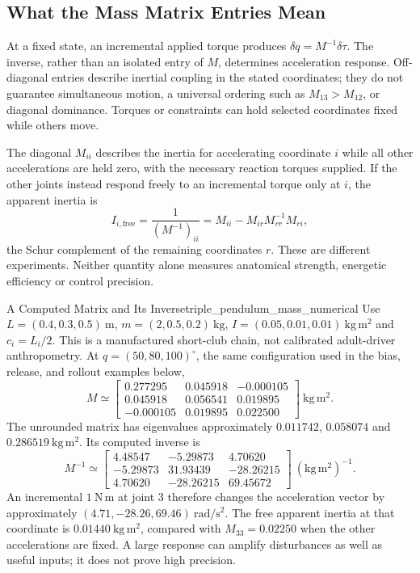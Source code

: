\subsection{What the Mass Matrix Entries Mean}
\label{inplain:mass_matrix_meaning}
\label{laymans:inplain:mass_matrix_meaning}
At a fixed state, an incremental applied torque produces $\delta\ddot q=M^{-1}\delta\tau$. The inverse, rather than an isolated entry of $M$, determines acceleration response. Off-diagonal entries describe inertial coupling in the stated coordinates; they do not guarantee simultaneous motion, a universal ordering such as $M_{13}>M_{12}$, or diagonal dominance. Torques or constraints can hold selected coordinates fixed while others move.

The diagonal $M_{ii}$ describes the inertia for accelerating coordinate $i$ while all other accelerations are held zero, with the necessary reaction torques supplied. If the other joints instead respond freely to an incremental torque only at $i$, the apparent inertia is
\[
I_{i,\mathrm{free}}=\frac{1}{(M^{-1})_{ii}}
=M_{ii}-M_{ir}M_{rr}^{-1}M_{ri},
\]
the Schur complement of the remaining coordinates $r$. These are different experiments. Neither quantity alone measures anatomical strength, energetic efficiency or control precision.

\begin{example}{A Computed Matrix and Its Inverse}{triple_pendulum_mass_numerical}
Use $L=(0.4,0.3,0.5)\ \mathrm m$, $m=(2,0.5,0.2)\ \mathrm{kg}$, $I=(0.05,0.01,0.01)\ \mathrm{kg\,m^2}$ and $c_i=L_i/2$. This is a manufactured short-club chain, not calibrated adult-driver anthropometry. At $q=(50,80,100)^\circ$, the same configuration used in the bias, release, and rollout examples below,
\begin{equation}
M\simeq\begin{bmatrix}
0.277295&0.045918&-0.000105\\
0.045918&0.056541&0.019895\\
-0.000105&0.019895&0.022500
\end{bmatrix}\ \mathrm{kg\,m^2}.
\label{eq:triple_mass_numerical}
\end{equation}
The unrounded matrix has eigenvalues approximately $0.011742$, $0.058074$ and $0.286519\ \mathrm{kg\,m^2}$. Its computed inverse is
\begin{equation}
M^{-1}\simeq\begin{bmatrix}
4.48547&-5.29873&4.70620\\
-5.29873&31.93439&-28.26215\\
4.70620&-28.26215&69.45672
\end{bmatrix}\ (\mathrm{kg\,m^2})^{-1}.
\label{eq:triple_mass_inverse_numerical}
\end{equation}
An incremental $1\ \mathrm{N\,m}$ at joint 3 therefore changes the acceleration vector by approximately $(4.71,-28.26,69.46)\ \mathrm{rad/s^2}$. The free apparent inertia at that coordinate is $0.01440\ \mathrm{kg\,m^2}$, compared with $M_{33}=0.02250$ when the other accelerations are fixed. A large response can amplify disturbances as well as useful inputs; it does not prove high precision.
\end{example}


